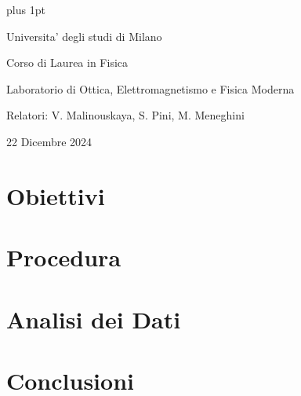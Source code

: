 \documentclass[draft, a4paper,12pt]{article}
\begin{document}
\parskip=10pt plus 1pt
\parindent=0pt

\begin{center}
    Universita' degli studi di Milano

    Corso di Laurea in Fisica

    \par{\Large{Laboratorio di Ottica, Elettromagnetismo e Fisica Moderna}}

    Relatori: V. Malinouskaya, S. Pini, M. Meneghini

    22 Dicembre 2024
\end{center}



\section{Obiettivi}


\section{Procedura}


\section{Analisi dei Dati}


\section{Conclusioni}

\end{document}
